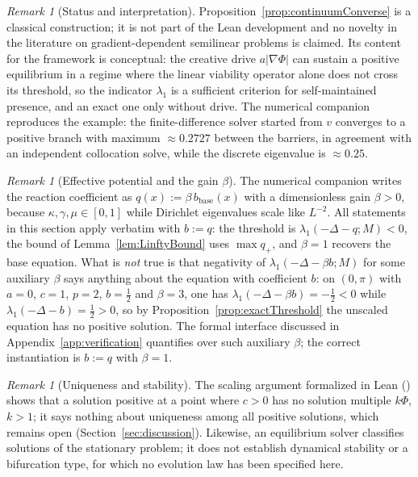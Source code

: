 \documentclass[11pt]{article}
\theoremstyle{plain}
\theoremstyle{definition}
\theoremstyle{remark}
\newtheorem{remark}[theorem]{Remark}
\begin{document}
\begin{remark}[Status and interpretation]\label{rem:continuumConverseStatus}
Proposition~\ref{prop:continuumConverse} is a classical construction; it is not part of the Lean development and no novelty in the literature on gradient-dependent semilinear problems is claimed. Its content for the framework is conceptual: the creative drive \(a|\nabla\Phi|\) can sustain a positive equilibrium in a regime where the linear viability operator alone does not cross its threshold, so the indicator \(\lambda_1\) is a sufficient criterion for self-maintained presence, and an exact one only without drive. The numerical companion reproduces the example: the finite-difference solver started from \(v\) converges to a positive branch with maximum \(\approx 0.2727\) between the barriers, in agreement with an independent collocation solve, while the discrete eigenvalue is \(\approx 0.25\).
\end{remark}

\begin{remark}[Effective potential and the gain \(\beta\)]\label{rem:effectivePotential}
The numerical companion writes the reaction coefficient as \(q(x):=\beta\,b_{\mathrm{base}}(x)\) with a dimensionless gain \(\beta>0\), because \(\kappa,\gamma,\mu\in[0,1]\) while Dirichlet eigenvalues scale like \(L^{-2}\). All statements in this section apply verbatim with \(b:=q\): the threshold is \(\lambda_1(-\Delta-q;M)<0\), the bound of Lemma~\ref{lem:LinftyBound} uses \(\max q_+\), and \(\beta=1\) recovers the base equation. What is \emph{not} true is that negativity of \(\lambda_1(-\Delta-\beta b;M)\) for some auxiliary \(\beta\) says anything about the equation with coefficient \(b\): on \((0,\pi)\) with \(a=0\), \(c=1\), \(p=2\), \(b=\tfrac12\) and \(\beta=3\), one has \(\lambda_1(-\Delta-\beta b)=-\tfrac12<0\) while \(\lambda_1(-\Delta-b)=\tfrac12>0\), so by Proposition~\ref{prop:exactThreshold} the unscaled equation has no positive solution. The formal interface discussed in Appendix~\ref{app:verification} quantifies over such auxiliary \(\beta\); the correct instantiation is \(b:=q\) with \(\beta=1\).
\end{remark}

\begin{remark}[Uniqueness and stability]\label{rem:uniquenessStatus}
The scaling argument formalized in Lean () shows that a solution positive at a point where \(c>0\) has no solution multiple \(k\Phi\), \(k>1\); it says nothing about uniqueness among all positive solutions, which remains open (Section~\ref{sec:discussion}). Likewise, an equilibrium solver classifies solutions of the stationary problem; it does not establish dynamical stability or a bifurcation type, for which no evolution law has been specified here.
\end{remark}
\end{document}
